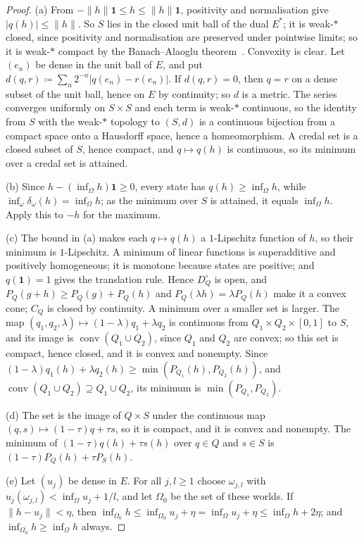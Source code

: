 \documentclass[11pt]{article}
\theoremstyle{definition}
\newcommand{\one}{\mathbf 1}
\DeclareMathOperator{\conv}{conv}
\begin{document}
\begin{proof}
(a) From $-\|h\|\one\le h\le\|h\|\one$, positivity and normalisation give $|q(h)|\le\|h\|$. So $S$ lies in the closed unit ball of the dual $E^\ast$; it is weak-$\ast$ closed, since positivity and normalisation are preserved under pointwise limits; so it is weak-$\ast$ compact by the Banach--Alaoglu theorem~\cite[Theorem~3.15]{Rudin}. Convexity is clear. Let $(e_n)$ be dense in the unit ball of $E$, and put $d(q,r)\coloneqq\sum_n2^{-n}|q(e_n)-r(e_n)|$. If $d(q,r)=0$, then $q=r$ on a dense subset of the unit ball, hence on $E$ by continuity; so $d$ is a metric. The series converges uniformly on $S\times S$ and each term is weak-$\ast$ continuous, so the identity from $S$ with the weak-$\ast$ topology to $(S,d)$ is a continuous bijection from a compact space onto a Hausdorff space, hence a homeomorphism. A credal set is a closed subset of $S$, hence compact, and $q\mapsto q(h)$ is continuous, so its minimum over a credal set is attained.

(b) Since $h-(\inf_\Omega h)\one\ge0$, every state has $q(h)\ge\inf_\Omega h$, while $\inf_\omega\delta_\omega(h)=\inf_\Omega h$; as the minimum over $S$ is attained, it equals $\inf_\Omega h$. Apply this to $-h$ for the maximum.

(c) The bound in (a) makes each $q\mapsto q(h)$ a $1$-Lipschitz function of $h$, so their minimum is $1$-Lipschitz. A minimum of linear functions is superadditive and positively homogeneous; it is monotone because states are positive; and $q(\one)=1$ gives the translation rule. Hence $D^\circ_Q$ is open, and $P_Q(g+h)\ge P_Q(g)+P_Q(h)$ and $P_Q(\lambda h)=\lambda P_Q(h)$ make it a convex cone; $C_Q$ is closed by continuity. A minimum over a smaller set is larger. The map $(q_1,q_2,\lambda)\mapsto(1-\lambda)q_1+\lambda q_2$ is continuous from $Q_1\times Q_2\times[0,1]$ to $S$, and its image is $\conv(Q_1\cup Q_2)$, since $Q_1$ and $Q_2$ are convex; so this set is compact, hence closed, and it is convex and nonempty. Since $(1-\lambda)q_1(h)+\lambda q_2(h)\ge\min(P_{Q_1}(h),P_{Q_2}(h))$, and $\conv(Q_1\cup Q_2)\supseteq Q_1\cup Q_2$, its minimum is $\min(P_{Q_1},P_{Q_2})$.

(d) The set is the image of $Q\times S$ under the continuous map $(q,s)\mapsto(1-\tau)q+\tau s$, so it is compact, and it is convex and nonempty. The minimum of $(1-\tau)q(h)+\tau s(h)$ over $q\in Q$ and $s\in S$ is $(1-\tau)P_Q(h)+\tau P_S(h)$.

(e) Let $(u_j)$ be dense in $E$. For all $j,l\ge1$ choose $\omega_{j,l}$ with $u_j(\omega_{j,l})<\inf_\Omega u_j+1/l$, and let $\Omega_0$ be the set of these worlds. If $\|h-u_j\|<\eta$, then $\inf_{\Omega_0}h\le\inf_{\Omega_0}u_j+\eta=\inf_\Omega u_j+\eta\le\inf_\Omega h+2\eta$; and $\inf_{\Omega_0}h\ge\inf_\Omega h$ always.
\end{proof}
\end{document}
